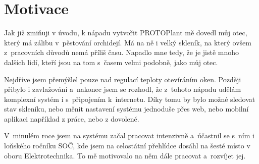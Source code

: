 \chapter{Motivace}
Jak již zmiňuji v úvodu, k nápadu vytvořit PROTOPlant mě dovedl můj otec, který má zálibu v~pěs\-to\-vá\-ní orchidejí.
Má na ně i velký skleník, na který ovšem z~pracovních důvodů nemá příliš času.
Napadlo mne tedy, že je jistě mnoho dalších lidí, kteří jsou na tom s~časem velmi podobně, jako můj otec.

Nejdříve jsem přemýšlel pouze nad regulací teploty otevíráním oken.
Později přibylo i zavlažování a~nakonec jsem se rozhodl, že z~tohoto nápadu udělám komplexní systém i s~připojením k~internetu.
Díky tomu by bylo možné sledovat stav skleníku, nebo měnit nastavení systému jednoduše přes web, nebo mobilní aplikaci například z práce, nebo z dovolené. 

V~minulém roce jsem na systému začal pracovat intenzivně a~účastnil se s~ním i loňského ročníku SOČ, kde jsem na celostátní přehlídce dosáhl na šesté místo v oboru Elektrotechnika.
To mě motivovalo na něm dále pracovat a~rozvíjet jej.

\fxnote[author=PŠ]{\textcolor{mygreen}{Zde je ještě potřeba provést úpravy.}}

\newpage